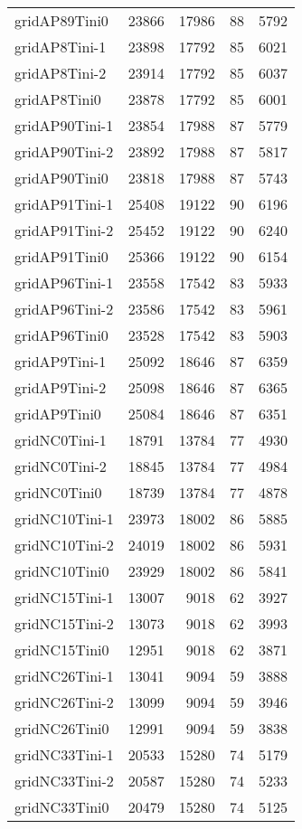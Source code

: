 \begin{longtable}{lrrrr}
gridAP89Tini0 & 23866 & 17986 & 88 & 5792 \\
gridAP8Tini-1 & 23898 & 17792 & 85 & 6021 \\
gridAP8Tini-2 & 23914 & 17792 & 85 & 6037 \\
gridAP8Tini0 & 23878 & 17792 & 85 & 6001 \\
gridAP90Tini-1 & 23854 & 17988 & 87 & 5779 \\
gridAP90Tini-2 & 23892 & 17988 & 87 & 5817 \\
gridAP90Tini0 & 23818 & 17988 & 87 & 5743 \\
gridAP91Tini-1 & 25408 & 19122 & 90 & 6196 \\
gridAP91Tini-2 & 25452 & 19122 & 90 & 6240 \\
gridAP91Tini0 & 25366 & 19122 & 90 & 6154 \\
gridAP96Tini-1 & 23558 & 17542 & 83 & 5933 \\
gridAP96Tini-2 & 23586 & 17542 & 83 & 5961 \\
gridAP96Tini0 & 23528 & 17542 & 83 & 5903 \\
gridAP9Tini-1 & 25092 & 18646 & 87 & 6359 \\
gridAP9Tini-2 & 25098 & 18646 & 87 & 6365 \\
gridAP9Tini0 & 25084 & 18646 & 87 & 6351 \\
gridNC0Tini-1 & 18791 & 13784 & 77 & 4930 \\
gridNC0Tini-2 & 18845 & 13784 & 77 & 4984 \\
gridNC0Tini0 & 18739 & 13784 & 77 & 4878 \\
gridNC10Tini-1 & 23973 & 18002 & 86 & 5885 \\
gridNC10Tini-2 & 24019 & 18002 & 86 & 5931 \\
gridNC10Tini0 & 23929 & 18002 & 86 & 5841 \\
gridNC15Tini-1 & 13007 & 9018 & 62 & 3927 \\
gridNC15Tini-2 & 13073 & 9018 & 62 & 3993 \\
gridNC15Tini0 & 12951 & 9018 & 62 & 3871 \\
gridNC26Tini-1 & 13041 & 9094 & 59 & 3888 \\
gridNC26Tini-2 & 13099 & 9094 & 59 & 3946 \\
gridNC26Tini0 & 12991 & 9094 & 59 & 3838 \\
gridNC33Tini-1 & 20533 & 15280 & 74 & 5179 \\
gridNC33Tini-2 & 20587 & 15280 & 74 & 5233 \\
gridNC33Tini0 & 20479 & 15280 & 74 & 5125 \\

\end{longtable}
